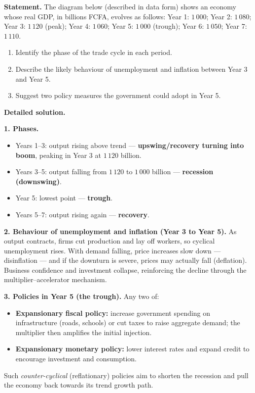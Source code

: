 \documentclass[11pt]{article}
\newcommand{\cle}[1]{{\popxbold\color{popdark}#1}}
\begin{document}
\begin{exoresolu}
\textbf{Statement.} The diagram below (described in data form) shows an economy whose real GDP, in billions FCFA, evolves as follows: Year 1: $1\,000$; Year 2: $1\,080$; Year 3: $1\,120$ (peak); Year 4: $1\,060$; Year 5: $1\,000$ (trough); Year 6: $1\,050$; Year 7: $1\,110$.
\begin{enumerate}
\item Identify the phase of the trade cycle in each period.
\item Describe the likely behaviour of unemployment and inflation between Year 3 and Year 5.
\item Suggest two policy measures the government could adopt in Year 5.
\end{enumerate}
\tcblower
\textbf{Detailed solution.}

\textbf{1. Phases.}
\begin{itemize}
\item Years 1--3: output rising above trend — \textbf{upswing/recovery turning into boom}, peaking in Year 3 at $1\,120$ billion.
\item Years 3--5: output falling from $1\,120$ to $1\,000$ billion — \textbf{recession (downswing)}.
\item Year 5: lowest point — \textbf{trough}.
\item Years 5--7: output rising again — \textbf{recovery}.
\end{itemize}

\textbf{2. Behaviour of unemployment and inflation (Year 3 to Year 5).} As output contracts, firms cut production and lay off workers, so \cle{cyclical unemployment} rises. With demand falling, price increases slow down — \cle{disinflation} — and if the downturn is severe, prices may actually fall (deflation). Business confidence and investment collapse, reinforcing the decline through the multiplier--accelerator mechanism.

\textbf{3. Policies in Year 5 (the trough).} Any two of:
\begin{itemize}
\item \textbf{Expansionary fiscal policy:} increase government spending on infrastructure (roads, schools) or cut taxes to raise aggregate demand; the multiplier then amplifies the initial injection.
\item \textbf{Expansionary monetary policy:} lower interest rates and expand credit to encourage investment and consumption.
\end{itemize}
Such \emph{counter-cyclical} (reflationary) policies aim to shorten the recession and pull the economy back towards its trend growth path.
\end{exoresolu}
\end{document}
